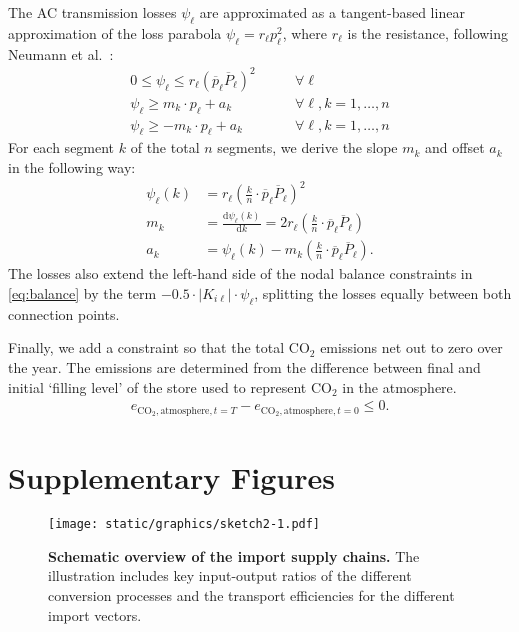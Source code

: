 The AC transmission losses $\psi_\ell$ are approximated as a tangent-based linear approximation
of the loss parabola $\psi_\ell = r_\ell p_\ell^2$, where $r_\ell$ is the
resistance, following Neumann et al.~\cite{neumannAssessmentsLinear2022}:
\begin{align}
    0 \leq \psi_\ell \leq r_\ell (\overline{p}_\ell \overline{P}_\ell)^2 & \qquad\forall \ell \\
    \psi_\ell \geq   m_k\cdot p_\ell + a_k & \qquad\forall \ell, k=1,\dots,n \\
	\psi_\ell \geq - m_k\cdot p_\ell + a_k & \qquad\forall \ell, k=1,\dots,n
\end{align}
For each segment $k$ of the total $n$ segments, we derive the slope $m_k$ and
offset $a_k$ in the following way:
\begin{align}
	\psi_\ell(k) &= r_\ell \left(\frac{k}{n}\cdot \overline{p}_\ell \overline{P}_\ell\right)^2 \\
	m_k &= \frac{\text{d} \psi_\ell(k) }{\text{d}k} = 2 r_\ell \left(\frac{k}{n}\cdot \overline{p}_\ell \overline{P}_\ell\right) \\
	a_k &= \psi_\ell(k) - m_k \left(\frac{k}{n}\cdot\overline{p}_\ell \overline{P}_\ell\right).
\end{align}
The losses also extend the left-hand side of the nodal balance constraints in
\cref{eq:balance} by the term $-0.5 \cdot |K_{i\ell}| \cdot \psi_\ell$, splitting
the losses equally between both connection points.

Finally, we add a constraint so that the total CO$_2$ emissions net out to zero
over the year. The emissions are determined from the difference between final
and initial `filling level' of the store used to represent CO$_2$ in the
atmosphere.
\begin{align}
	e_{\text{CO}_2,\text{atmosphere},t=T} - e_{\text{CO}_2,\text{atmosphere},t=0}  \leq 0.
\end{align}

\clearpage
\section{Supplementary Figures}

\begin{figure*}[!htb]
    \centering
    \texttt{[image: static/graphics/sketch2-1.pdf]}
    \caption{\textbf{Schematic overview of the import supply chains.} The
    illustration includes key input-output ratios of the different conversion
    processes and the transport efficiencies for the different import vectors.}
    \label{fig:si:import-esc-scheme}
\end{figure*}

